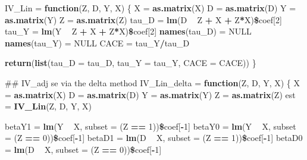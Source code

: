 \documentclass[]{article}
\newenvironment{Shaded}{\begin{snugshade}}{\end{snugshade}}
\newcommand{\KeywordTok}[1]{\textcolor[rgb]{0.13,0.29,0.53}{\textbf{#1}}}
\newcommand{\DataTypeTok}[1]{\textcolor[rgb]{0.13,0.29,0.53}{#1}}
\newcommand{\DecValTok}[1]{\textcolor[rgb]{0.00,0.00,0.81}{#1}}
\newcommand{\StringTok}[1]{\textcolor[rgb]{0.31,0.60,0.02}{#1}}
\newcommand{\OtherTok}[1]{\textcolor[rgb]{0.56,0.35,0.01}{#1}}
\newcommand{\ControlFlowTok}[1]{\textcolor[rgb]{0.13,0.29,0.53}{\textbf{#1}}}
\newcommand{\OperatorTok}[1]{\textcolor[rgb]{0.81,0.36,0.00}{\textbf{#1}}}
\newcommand{\NormalTok}[1]{#1}
\begin{document}
\begin{Shaded}
\begin{Highlighting}[]
\NormalTok{IV_Lin =}\StringTok{ }\ControlFlowTok{function}\NormalTok{(Z, D, Y, X)}
\NormalTok{\{}
\NormalTok{  X =}\StringTok{ }\KeywordTok{as.matrix}\NormalTok{(X)}
\NormalTok{  D =}\StringTok{ }\KeywordTok{as.matrix}\NormalTok{(D)}
\NormalTok{  Y =}\StringTok{ }\KeywordTok{as.matrix}\NormalTok{(Y)}
\NormalTok{  Z =}\StringTok{ }\KeywordTok{as.matrix}\NormalTok{(Z)}
\NormalTok{  tau_D =}\StringTok{ }\KeywordTok{lm}\NormalTok{(D }\OperatorTok{~}\StringTok{ }\NormalTok{Z }\OperatorTok{+}\StringTok{ }\NormalTok{X }\OperatorTok{+}\StringTok{ }\NormalTok{Z}\OperatorTok{*}\NormalTok{X)}\OperatorTok{\$}\NormalTok{coef[}\DecValTok{2}\NormalTok{]}
\NormalTok{  tau_Y =}\StringTok{ }\KeywordTok{lm}\NormalTok{(Y }\OperatorTok{~}\StringTok{ }\NormalTok{Z }\OperatorTok{+}\StringTok{ }\NormalTok{X }\OperatorTok{+}\StringTok{ }\NormalTok{Z}\OperatorTok{*}\NormalTok{X)}\OperatorTok{\$}\NormalTok{coef[}\DecValTok{2}\NormalTok{]}
  \KeywordTok{names}\NormalTok{(tau_D) =}\StringTok{ }\OtherTok{NULL}
  \KeywordTok{names}\NormalTok{(tau_Y) =}\StringTok{ }\OtherTok{NULL}
\NormalTok{  CACE  =}\StringTok{ }\NormalTok{tau_Y}\OperatorTok{/}\NormalTok{tau_D}
  
  \KeywordTok{return}\NormalTok{(}\KeywordTok{list}\NormalTok{(}\DataTypeTok{tau_D =}\NormalTok{ tau_D, }\DataTypeTok{tau_Y =}\NormalTok{ tau_Y,}
              \DataTypeTok{CACE  =}\NormalTok{ CACE))}
\NormalTok{\}}

\NormalTok{## IV_adj se via the delta method}
\NormalTok{IV_Lin_delta =}\StringTok{ }\ControlFlowTok{function}\NormalTok{(Z, D, Y, X)}
\NormalTok{\{}
\NormalTok{  X =}\StringTok{ }\KeywordTok{as.matrix}\NormalTok{(X)}
\NormalTok{  D =}\StringTok{ }\KeywordTok{as.matrix}\NormalTok{(D)}
\NormalTok{  Y =}\StringTok{ }\KeywordTok{as.matrix}\NormalTok{(Y)}
\NormalTok{  Z =}\StringTok{ }\KeywordTok{as.matrix}\NormalTok{(Z)}
\NormalTok{  est    =}\StringTok{ }\KeywordTok{IV_Lin}\NormalTok{(Z, D, Y, X)}
  
\NormalTok{  betaY1 =}\StringTok{ }\KeywordTok{lm}\NormalTok{(Y }\OperatorTok{~}\StringTok{ }\NormalTok{X, }\DataTypeTok{subset =}\NormalTok{ (Z }\OperatorTok{==}\StringTok{ }\DecValTok{1}\NormalTok{))}\OperatorTok{\$}\NormalTok{coef[}\OperatorTok{-}\DecValTok{1}\NormalTok{]}
\NormalTok{  betaY0 =}\StringTok{ }\KeywordTok{lm}\NormalTok{(Y }\OperatorTok{~}\StringTok{ }\NormalTok{X, }\DataTypeTok{subset =}\NormalTok{ (Z }\OperatorTok{==}\StringTok{ }\DecValTok{0}\NormalTok{))}\OperatorTok{\$}\NormalTok{coef[}\OperatorTok{-}\DecValTok{1}\NormalTok{]}
\NormalTok{  betaD1 =}\StringTok{ }\KeywordTok{lm}\NormalTok{(D }\OperatorTok{~}\StringTok{ }\NormalTok{X, }\DataTypeTok{subset =}\NormalTok{ (Z }\OperatorTok{==}\StringTok{ }\DecValTok{1}\NormalTok{))}\OperatorTok{\$}\NormalTok{coef[}\OperatorTok{-}\DecValTok{1}\NormalTok{]}
\NormalTok{  betaD0 =}\StringTok{ }\KeywordTok{lm}\NormalTok{(D }\OperatorTok{~}\StringTok{ }\NormalTok{X, }\DataTypeTok{subset =}\NormalTok{ (Z }\OperatorTok{==}\StringTok{ }\DecValTok{0}\NormalTok{))}\OperatorTok{\$}\NormalTok{coef[}\OperatorTok{-}\DecValTok{1}\NormalTok{]}
  

\end{Highlighting}
\end{Shaded}
\end{document}
